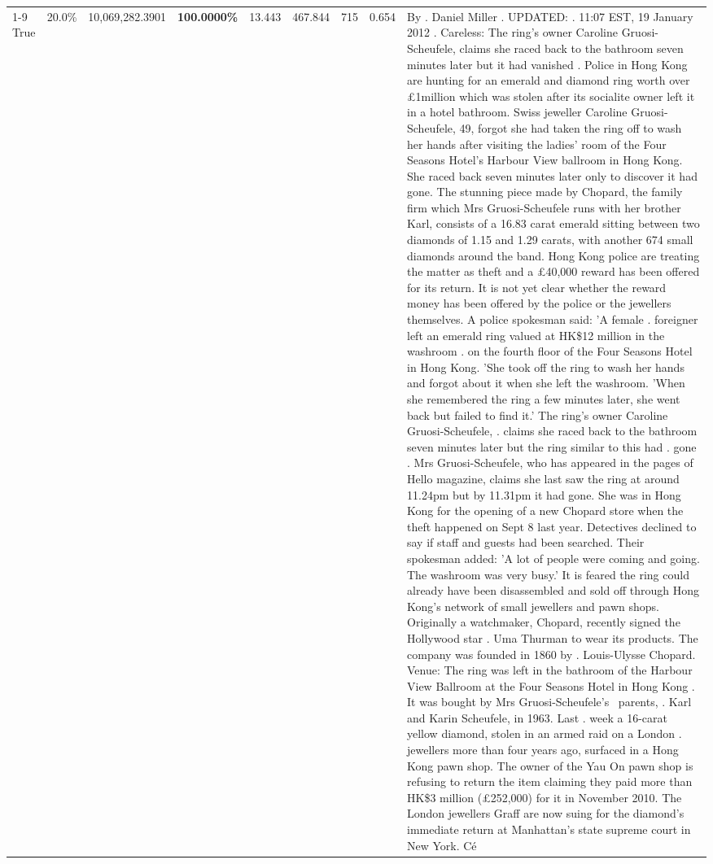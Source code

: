 \begin{table}[H]
\begin{tabular}{lllrlllll}
\cline{1-9}
True & 20.0\% & 10,069,282.3901 & \bfseries \color{red} 100.0000\% & 13.443 & 467.844 & 715 & 0.654 & By . Daniel Miller . UPDATED: . 11:07 EST, 19 January 2012 . Careless: The ring's owner Caroline Gruosi-Scheufele, claims she raced back to the bathroom seven minutes later but it had vanished . Police in Hong Kong are hunting for an emerald and diamond ring worth over £1million which was stolen after its socialite owner left it in a hotel bathroom. Swiss jeweller Caroline Gruosi-Scheufele, 49, forgot she had taken the ring off to wash her hands after visiting the ladies' room of the Four Seasons Hotel's Harbour View ballroom in Hong Kong. She raced back seven minutes later only to discover it had gone. The stunning piece made by Chopard, the family firm which Mrs Gruosi-Scheufele runs with her brother Karl, consists of a 16.83 carat emerald sitting between two diamonds of 1.15 and 1.29 carats, with another 674 small diamonds around the band. Hong Kong police are treating the matter as theft and a £40,000 reward has been offered for its return. It is not yet clear whether the reward money has been offered by the police or the jewellers themselves. A police spokesman said: 'A female . foreigner left an emerald ring valued at HK\$12 million in the washroom . on the fourth floor of the Four Seasons Hotel in Hong Kong. 'She took off the ring to wash her hands and forgot about it when she left the washroom. 'When she remembered the ring a few minutes later, she went back but failed to find it.' The ring's owner Caroline Gruosi-Scheufele, . claims she raced back to the bathroom seven minutes later but the ring similar to this had . gone . Mrs Gruosi-Scheufele, who has appeared in the pages of Hello magazine, claims she last saw the ring at around 11.24pm but by 11.31pm it had gone. She was in Hong Kong for the opening of a new Chopard store when the theft happened on Sept 8 last year. Detectives declined to say if staff and guests had been searched. Their spokesman added: 'A lot of people were coming and going. The washroom was very busy.' It is feared the ring could already have been disassembled and sold off through Hong Kong's network of small jewellers and pawn shops. Originally a watchmaker, Chopard, recently signed the Hollywood star . Uma Thurman to wear its products. The company was founded in 1860 by . Louis-Ulysse Chopard. Venue: The ring was left in the bathroom of the Harbour View Ballroom at the Four Seasons Hotel in Hong Kong . It was bought by Mrs Gruosi-Scheufele's  parents, . Karl and Karin Scheufele, in 1963. Last . week a 16-carat yellow diamond, stolen in an armed raid on a London . jewellers more than four years ago, surfaced in a Hong Kong pawn shop. The owner of the Yau On pawn shop is refusing to return the item claiming they paid more than HK\$3 million (£252,000) for it in November 2010. The London jewellers Graff are now suing for the diamond’s immediate return at Manhattan’s state supreme court in New York. Cé \\

\end{tabular}
\end{table}
